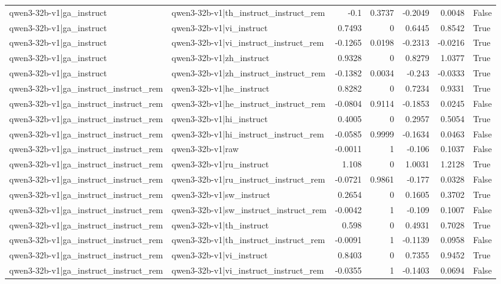 \begin{table}
\begin{tabular}{l l r r r r l}
qwen3-32b-v1|ga_instruct & qwen3-32b-v1|th_instruct_instruct_rem & -0.1 & 0.3737 & -0.2049 & 0.0048 & False \\
qwen3-32b-v1|ga_instruct & qwen3-32b-v1|vi_instruct & 0.7493 & 0 & 0.6445 & 0.8542 & True \\
qwen3-32b-v1|ga_instruct & qwen3-32b-v1|vi_instruct_instruct_rem & -0.1265 & 0.0198 & -0.2313 & -0.0216 & True \\
qwen3-32b-v1|ga_instruct & qwen3-32b-v1|zh_instruct & 0.9328 & 0 & 0.8279 & 1.0377 & True \\
qwen3-32b-v1|ga_instruct & qwen3-32b-v1|zh_instruct_instruct_rem & -0.1382 & 0.0034 & -0.243 & -0.0333 & True \\
qwen3-32b-v1|ga_instruct_instruct_rem & qwen3-32b-v1|he_instruct & 0.8282 & 0 & 0.7234 & 0.9331 & True \\
qwen3-32b-v1|ga_instruct_instruct_rem & qwen3-32b-v1|he_instruct_instruct_rem & -0.0804 & 0.9114 & -0.1853 & 0.0245 & False \\
qwen3-32b-v1|ga_instruct_instruct_rem & qwen3-32b-v1|hi_instruct & 0.4005 & 0 & 0.2957 & 0.5054 & True \\
qwen3-32b-v1|ga_instruct_instruct_rem & qwen3-32b-v1|hi_instruct_instruct_rem & -0.0585 & 0.9999 & -0.1634 & 0.0463 & False \\
qwen3-32b-v1|ga_instruct_instruct_rem & qwen3-32b-v1|raw & -0.0011 & 1 & -0.106 & 0.1037 & False \\
qwen3-32b-v1|ga_instruct_instruct_rem & qwen3-32b-v1|ru_instruct & 1.108 & 0 & 1.0031 & 1.2128 & True \\
qwen3-32b-v1|ga_instruct_instruct_rem & qwen3-32b-v1|ru_instruct_instruct_rem & -0.0721 & 0.9861 & -0.177 & 0.0328 & False \\
qwen3-32b-v1|ga_instruct_instruct_rem & qwen3-32b-v1|sw_instruct & 0.2654 & 0 & 0.1605 & 0.3702 & True \\
qwen3-32b-v1|ga_instruct_instruct_rem & qwen3-32b-v1|sw_instruct_instruct_rem & -0.0042 & 1 & -0.109 & 0.1007 & False \\
qwen3-32b-v1|ga_instruct_instruct_rem & qwen3-32b-v1|th_instruct & 0.598 & 0 & 0.4931 & 0.7028 & True \\
qwen3-32b-v1|ga_instruct_instruct_rem & qwen3-32b-v1|th_instruct_instruct_rem & -0.0091 & 1 & -0.1139 & 0.0958 & False \\
qwen3-32b-v1|ga_instruct_instruct_rem & qwen3-32b-v1|vi_instruct & 0.8403 & 0 & 0.7355 & 0.9452 & True \\
qwen3-32b-v1|ga_instruct_instruct_rem & qwen3-32b-v1|vi_instruct_instruct_rem & -0.0355 & 1 & -0.1403 & 0.0694 & False \\

\end{tabular}
\end{table}
